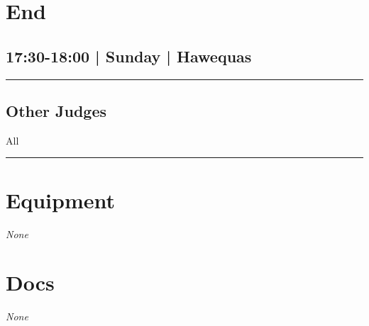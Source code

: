 \documentclass[10pt, A5]{article}
\begin{document}
        \begin{framed}
        \begin{minipage}{\textwidth}

        \setcounter{section}{94}
        \section{End}
        \subsection*{17:30-18:00 | Sunday | Hawequas}

        \vspace{0.25cm}
        \hrule
        \vspace{0.25cm}


        \subsection*{Other Judges}
                    All

            \vspace{0.25cm}
        \hrule
        \vspace{0.25cm}

        \begin{multicols}{2}

		\section*{\faWrench \: Equipment}

				\textit{None}
		
		\vfill\null
		\columnbreak

			\section*{\faFile \: Docs}
		 	\textit{None}
	

		\vfill\null

		\end{multicols}
\end{minipage}
\end{framed}
\end{document}
